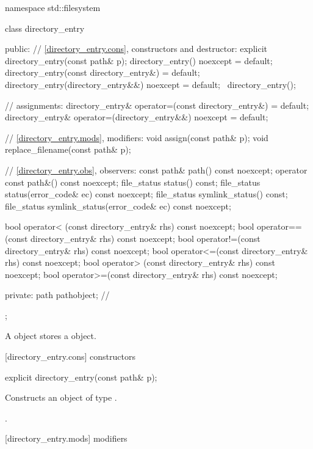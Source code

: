 %
\begin{codeblock}
namespace std::filesystem {
  class directory_entry {
  public:
    // \ref{directory_entry.cons}, constructors and destructor:
    explicit directory_entry(const path& p);
    directory_entry() noexcept = default;
    directory_entry(const directory_entry&) = default;
    directory_entry(directory_entry&&) noexcept = default;
   ~directory_entry();

    // assignments:
    directory_entry& operator=(const directory_entry&) = default;
    directory_entry& operator=(directory_entry&&) noexcept = default;

    // \ref{directory_entry.mods}, modifiers:
    void assign(const path& p);
    void replace_filename(const path& p);

    // \ref{directory_entry.obs}, observers:
    const path&  path() const noexcept;
    operator const path&() const noexcept;
    file_status  status() const;
    file_status  status(error_code& ec) const noexcept;
    file_status  symlink_status() const;
    file_status  symlink_status(error_code& ec) const noexcept;

    bool operator< (const directory_entry& rhs) const noexcept;
    bool operator==(const directory_entry& rhs) const noexcept;
    bool operator!=(const directory_entry& rhs) const noexcept;
    bool operator<=(const directory_entry& rhs) const noexcept;
    bool operator> (const directory_entry& rhs) const noexcept;
    bool operator>=(const directory_entry& rhs) const noexcept;

  private:
    path   pathobject; // \expos
  };
}
\end{codeblock}
\pnum
A  object stores a  object.

[directory_entry.cons]{ constructors}

%
\begin{itemdecl}
explicit directory_entry(const path& p);
\end{itemdecl}

\begin{itemdescr}
\pnum
\effects Constructs an object of type .

\pnum
\postconditions {}.
\end{itemdescr}

[directory_entry.mods]{ modifiers}

